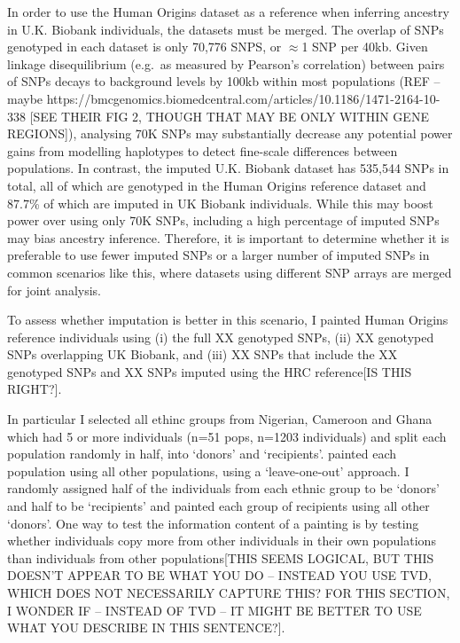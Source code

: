 {In order to use the Human Origins dataset as a reference when inferring ancestry in U.K. Biobank individuals, the datasets must be merged. The overlap of SNPs genotyped in each dataset is only 70,776 SNPS, or $\approx$1 SNP per 40kb. Given linkage disequilibrium (e.g.\ as measured by Pearson's correlation) between pairs of SNPs decays to background levels by 100kb within most populations (REF -- maybe https://bmcgenomics.biomedcentral.com/articles/10.1186/1471-2164-10-338 [SEE THEIR FIG 2, THOUGH THAT MAY BE ONLY WITHIN GENE REGIONS]), analysing 70K SNPs may substantially decrease any potential power gains from modelling haplotypes to detect fine-scale differences between populations. In contrast, the imputed U.K. Biobank dataset has 535,544 SNPs in total, all of which are genotyped in the Human Origins reference dataset and 87.7\% of which are imputed in UK Biobank individuals. While this may boost power over using only 70K SNPs, including a high percentage of imputed SNPs may bias ancestry inference. Therefore, it is important to determine whether it is preferable to use fewer imputed SNPs or a larger number of imputed SNPs in common scenarios like this, where datasets using different SNP arrays are merged for joint analysis.

To assess whether imputation is better in this scenario, I painted Human Origins reference individuals using (i) the full XX genotyped SNPs, (ii) XX genotyped SNPs overlapping UK Biobank, and (iii) XX SNPs that include the XX genotyped SNPs and XX SNPs imputed using the HRC reference[IS THIS RIGHT?]. 

In particular I selected all ethinc groups from Nigerian, Cameroon and Ghana which had 5 or more individuals (n=51 pops, n=1203 individuals) and split each population randomly in half, into `donors' and `recipients'. painted each population using all other populations, using a `leave-one-out' approach. I randomly assigned half of the individuals from each ethnic group to be `donors' and half to be `recipients' and painted each group of recipients using all other `donors'. One way to test the information content of a painting is by testing whether individuals copy more from other individuals in their own populations than individuals from other populations[THIS SEEMS LOGICAL, BUT THIS DOESN'T APPEAR TO BE WHAT YOU DO -- INSTEAD YOU USE TVD, WHICH DOES NOT NECESSARILY CAPTURE THIS? FOR THIS SECTION, I WONDER IF -- INSTEAD OF TVD -- IT MIGHT BE BETTER TO USE WHAT YOU DESCRIBE IN THIS SENTENCE?]. 

}
